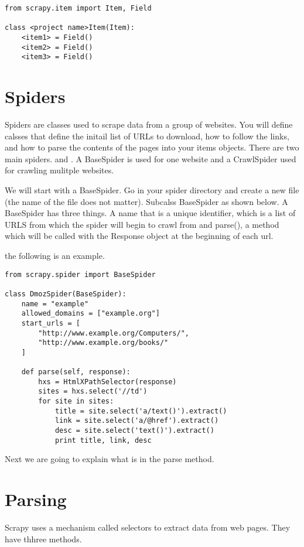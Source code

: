 \begin{lstlisting}
from scrapy.item import Item, Field

class <project name>Item(Item):
    <item1> = Field()
    <item2> = Field()
    <item3> = Field()
\end{lstlisting}

\section*{Spiders}
Spiders are classes used to scrape data from a group of websites. You will define calsses that define the initail list of URLs to download, how to follow the links, and how to parse the contents of the pages into your items objects. There are two main spiders.  and . A BaseSpider is used for one website and a CrawlSpider used for crawling mulitple websites.

We will start with a BaseSpider. Go in your spider directory and create a new file (the name of the file does not matter). Subcalss BaseSpider as shown below. A BaseSpider has three things. A name that is a unique identifier,  which is a list of URLS from which the spider will begin to crawl from and parse(), a method which will be called with the Response object at the beginning of each url.

the following is an example.
\begin{lstlisting}
from scrapy.spider import BaseSpider

class DmozSpider(BaseSpider):
    name = "example"
    allowed_domains = ["example.org"]
    start_urls = [
        "http://www.example.org/Computers/",
        "http://www.example.org/books/"
    ]

    def parse(self, response):
        hxs = HtmlXPathSelector(response)
        sites = hxs.select('//td')
        for site in sites:
            title = site.select('a/text()').extract()
            link = site.select('a/@href').extract()
            desc = site.select('text()').extract()
            print title, link, desc
\end{lstlisting}

Next we are going to explain what is in the parse method.

\section*{Parsing}
Scrapy uses a mechanism called selectors to extract data from web pages.
They have thhree methods.

